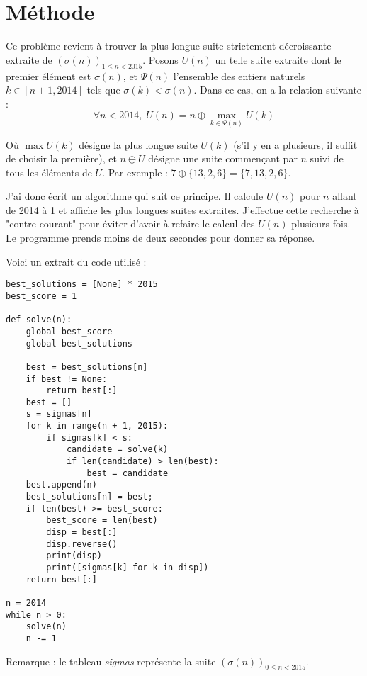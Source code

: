 \documentclass[10pt,a4paper,twocolumn]{article}
\begin{document}
\section{Méthode}

Ce problème revient à trouver la plus longue suite strictement décroissante extraite de $\left(\sigma(n)\right)_{1\leq n < 2015}$.
Posons $U(n)$ un telle suite extraite dont le premier élément est $\sigma(n)$, et $\Psi(n)$ l'ensemble des entiers naturels $k \in [n+1,2014]$ tels que $\sigma(k) < \sigma(n)$. Dans ce cas, on a la relation suivante :
$$\forall n < 2014, \; U(n) = n \oplus \max_{k \in \Psi(n)}U(k)$$

Où $\max U(k)$ désigne la plus longue suite $U(k)$ (s'il y en a plusieurs, il suffit de choisir la première), et $n\oplus U$ désigne une suite commençant par $n$ suivi de tous les éléments de $U$. Par exemple : $7 \oplus \{13, 2, 6\} = \{7,13,2,6\}$.

J'ai donc écrit un algorithme qui suit ce principe. Il calcule $U(n)$ pour $n$ allant de 2014 à 1 et affiche les plus longues suites extraites. J'effectue cette recherche à "contre-courant" pour éviter d'avoir à refaire le calcul des $U(n)$ plusieurs fois. Le programme prends moins de deux secondes pour donner sa réponse.

Voici un extrait du code utilisé :

\begin{verbatim}
best_solutions = [None] * 2015
best_score = 1

def solve(n):
    global best_score
    global best_solutions

    best = best_solutions[n]
    if best != None:
        return best[:]
    best = []
    s = sigmas[n]
    for k in range(n + 1, 2015):
        if sigmas[k] < s:
            candidate = solve(k)
            if len(candidate) > len(best):
                best = candidate
    best.append(n)
    best_solutions[n] = best;
    if len(best) >= best_score:
        best_score = len(best)
        disp = best[:]
        disp.reverse()
        print(disp)
        print([sigmas[k] for k in disp])
    return best[:]

n = 2014
while n > 0:
    solve(n)
    n -= 1
\end{verbatim}

Remarque : le tableau \emph{sigmas} représente la suite $\left(\sigma(n)\right)_{0\leq n < 2015}$. 
\end{document}

